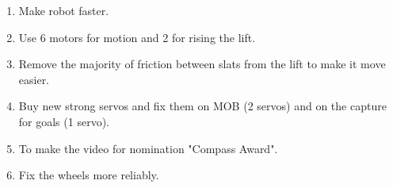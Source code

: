 \begin{enumerate}
\begin{enumerate}
		\item Make robot faster.
			
		\item Use 6 motors for motion and 2 for rising the lift.
		
		\item Remove the majority of friction between slats from the lift to make it move easier.
		
		\item Buy new strong servos and fix them on MOB (2 servos) and on the capture for goals (1 servo).
		
		\item To make the video for nomination "Compass Award".
		
		\item Fix the wheels more reliably.
		
	\end{enumerate}
	
\end{enumerate}
\fillpage